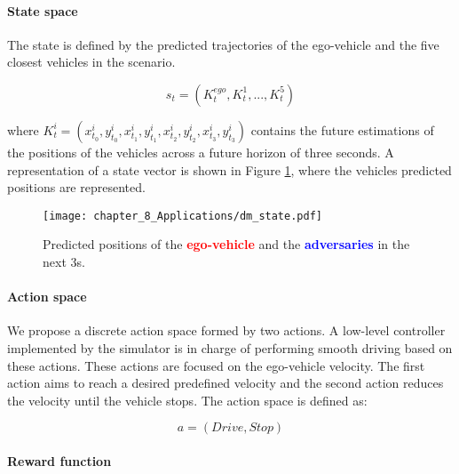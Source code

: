 \paragraph{State space}
\label{par:8_decision_making_our_approach_dm_state_space}

The state is defined by the predicted trajectories of the ego-vehicle and the five closest vehicles in the scenario.

\begin{equation}
	s_t = (K^{ego}_t, K^1_t, ..., K^{5}_t)
	\label{eq:state}
\end{equation}

where $K^{i}_t = (x^i_{t_0}, y^i_{t_0}, x^i_{t_1}, y^i_{t_1}, x^i_{t_2}, y^i_{t_2}, x^i_{t_3}, y^i_{t_3})$ contains the future estimations of the positions of the vehicles across a future horizon of three seconds. A representation of a state vector is shown in Figure \ref{fig:chapter_8_Applications/dm_state}, where the vehicles predicted positions are represented.

\begin{figure}[h]
	\centering
	\texttt{[image: chapter\_8\_Applications/dm\_state.pdf]}
	\caption[Predicted positions of the ego-vehicle and the adversaries in the next 3s]{Predicted positions of the \textbf{\textcolor{red}{ego-vehicle}} and the \textbf{\textcolor{blue}{adversaries}} in the next 3s.}	
	\label{fig:chapter_8_Applications/dm_state}
\end{figure}

\paragraph{Action space}
\label{par:8_decision_making_our_approach_dm_action_space}

We propose a discrete action space formed by two actions. A low-level controller implemented by the simulator is in charge of performing smooth driving based on these actions. These actions are focused on the ego-vehicle velocity. The first action aims to reach a desired predefined velocity and the second action reduces the velocity until the vehicle stops. The action space is defined as:

\begin{equation}
	a=(Drive, Stop)    
	\label{eq:action}
\end{equation}

\paragraph{Reward function}
\label{par:8_decision_making_our_approach_dm_reward_function}

